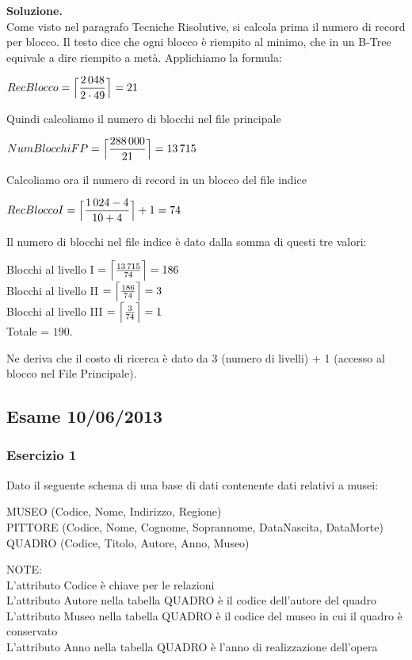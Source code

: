 \noindent\textbf{\fontsize{14pt}{1em}Soluzione.}\\
Come visto nel paragrafo Tecniche Risolutive, si calcola prima il numero di record per blocco. Il testo dice che 
ogni blocco è riempito al minimo, che in un B-Tree equivale a dire riempito a metà. Applichiamo la formula:
 \begin{center}
 $RecBlocco = \Bigl\lceil \dfrac{2\,048}{2\cdot 49} \Bigr\rceil = 21$\\
\end{center}
Quindi calcoliamo il numero di blocchi nel file principale
\begin{center}
 $NumBlocchiFP = \Bigl\lceil \dfrac{288\,000}{21} \Bigr\rceil = 13\,715$\\
\end{center}
Calcoliamo ora il numero di record in un blocco del file indice
\begin{center}
 $RecBloccoI = \Bigl\lceil \dfrac{1\,024-4}{10+4} \Bigr\rceil + 1 = 74$\\
\end{center}
Il numero di blocchi nel file indice è dato dalla somma di questi tre valori:
\begin{center}
 Blocchi al livello I $= \Bigl\lceil \frac{13\,715}{74} \Bigr\rceil = 186$\\
 
 Blocchi al livello II $= \Bigl\lceil \frac{186}{74} \Bigr\rceil = 3$\\
 
 Blocchi al livello III $= \Bigl\lceil \frac{3}{74} \Bigr\rceil = 1$\\
 Totale = $190$.
\end{center}
Ne deriva che il costo di ricerca è dato da 3 (numero di livelli) + 1 (accesso al blocco nel File Principale).
\newpage
\subsection{Esame 10/06/2013}
  \subsubsection{Esercizio 1}
  Dato il seguente schema di una base di dati contenente dati relativi a musei:
  \begin{center}
  MUSEO (Codice, Nome, Indirizzo, Regione)\\
  PITTORE (Codice, Nome, Cognome, Soprannome, DataNascita, DataMorte)\\
  QUADRO (Codice, Titolo, Autore, Anno, Museo)\\
  \end{center}
  NOTE:\\
  L'attributo Codice è chiave per le relazioni\\
  L'attributo Autore nella tabella QUADRO è il codice dell'autore del quadro\\
  L'attributo Museo nella tabella QUADRO è il codice del museo in cui il quadro è conservato\\
  L'attributo Anno nella tabella QUADRO è l'anno di realizzazione dell'opera\\

